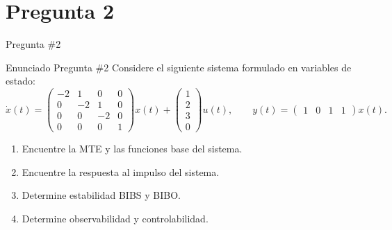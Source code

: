 \documentclass[
    10pt,
    aspectratio=169,
    xcolor={dvipsnames},
    spanish,
    ]{beamer}
\begin{document}
\section{Pregunta 2}
\begin{frame}{Pregunta \#2}
  \begin{block}{Enunciado Pregunta \#2}
   Considere el siguiente sistema formulado en variables de estado:
\begin{equation}
  \dot{x}(t) =
  \begin{pmatrix}
    -2 & 1 & 0 & 0 \\
     0 & -2 & 1 & 0 \\
     0 &  0 & -2 & 0 \\
     0 &  0 &  0 & 1
  \end{pmatrix} x(t)
  +
  \begin{pmatrix}
    1 \\
    2 \\
    3 \\
    0
  \end{pmatrix} u(t),
  \qquad
  y(t) = \begin{pmatrix} 1 & 0 & 1 & 1 \end{pmatrix} x(t).
\end{equation}

\begin{enumerate}
  \item Encuentre la MTE y las funciones base del sistema.
  \item Encuentre la respuesta al impulso del sistema.
  \item Determine estabilidad BIBS y BIBO.
  \item Determine observabilidad y controlabilidad.
\end{enumerate}

  \end{block}
\end{frame}

\end{document}
